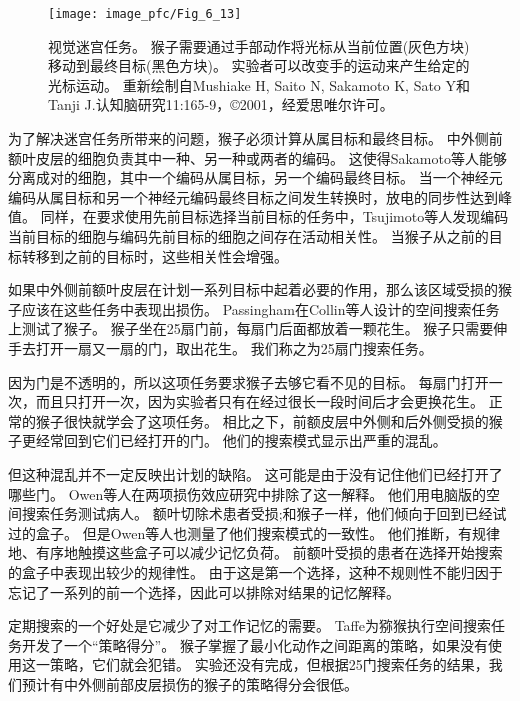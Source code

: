 \begin{figure}
	\centering
	\texttt{[image: image\_pfc/Fig\_6\_13]}
	\caption{视觉迷宫任务。
		猴子需要通过手部动作将光标从当前位置(灰色方块)移动到最终目标(黑色方块)。
		实验者可以改变手的运动来产生给定的光标运动。
		重新绘制自Mushiake H, Saito N, Sakamoto K, Sato Y和Tanji J.认知脑研究11:165-9，©2001，经爱思唯尔许可。}
	\label{fig:6_13}
\end{figure}


为了解决迷宫任务所带来的问题，猴子必须计算从属目标和最终目标。
中外侧前额叶皮层的细胞负责其中一种、另一种或两者的编码\cite{saito2005representation}。
这使得Sakamoto等人\cite{sakamoto2008discharge}能够分离成对的细胞，其中一个编码从属目标，另一个编码最终目标。
当一个神经元编码从属目标和另一个神经元编码最终目标之间发生转换时，放电的同步性达到峰值。
同样，在要求使用先前目标选择当前目标的任务中，Tsujimoto等人\cite{tsujimoto2008transient}发现编码当前目标的细胞与编码先前目标的细胞之间存在活动相关性。
当猴子从之前的目标转移到之前的目标时，这些相关性会增强。


如果中外侧前额叶皮层在计划一系列目标中起着必要的作用，那么该区域受损的猴子应该在这些任务中表现出损伤。
Passingham\cite{passingham1985memory}在Collin等人\cite{collin1982role}设计的空间搜索任务上测试了猴子。
猴子坐在25扇门前，每扇门后面都放着一颗花生。
猴子只需要伸手去打开一扇又一扇的门，取出花生。
我们称之为25扇门搜索任务。


因为门是不透明的，所以这项任务要求猴子去够它看不见的目标。
每扇门打开一次，而且只打开一次，因为实验者只有在经过很长一段时间后才会更换花生。
正常的猴子很快就学会了这项任务。
相比之下，前额皮层中外侧和后外侧受损的猴子更经常回到它们已经打开的门。
他们的搜索模式显示出严重的混乱。


但这种混乱并不一定反映出计划的缺陷。
这可能是由于没有记住他们已经打开了哪些门。
Owen等人在两项损伤效应研究中排除了这一解释。
他们用电脑版的空间搜索任务测试病人。
额叶切除术患者受损;和猴子一样，他们倾向于回到已经试过的盒子。
但是Owen等人也测量了他们搜索模式的一致性。
他们推断，有规律地、有序地触摸这些盒子可以减少记忆负荷。
前额叶受损的患者在选择开始搜索的盒子中表现出较少的规律性。
由于这是第一个选择，这种不规则性不能归因于忘记了一系列的前一个选择，因此可以排除对结果的记忆解释。


定期搜索的一个好处是它减少了对工作记忆的需要。
Taffe\cite{taffe2011rhesus}为猕猴执行空间搜索任务开发了一个“策略得分”。
猴子掌握了最小化动作之间距离的策略，如果没有使用这一策略，它们就会犯错。
实验还没有完成，但根据25门搜索任务的结果，我们预计有中外侧前部皮层损伤的猴子的策略得分会很低。


